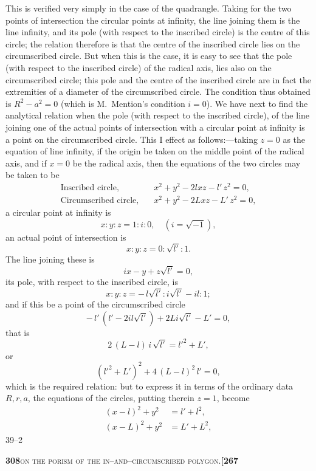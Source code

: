 \documentclass[11pt]{article}
\begin{document}
\noindent This is verified very simply in the case of the quadrangle. Taking for the two points of intersection the circular points at infinity, the line joining them is the line infinity, and its pole (with respect to the inscribed circle) is the centre of this circle; the relation therefore is that the centre of the inscribed circle lies on the circumscribed circle. But when this is the case, it is easy to see that the pole (with respect to the inscribed circle) of the radical axis, lies also on the circumscribed circle; this pole and the centre of the inscribed circle are in fact the extremities of a diameter of the circumscribed circle. The condition thus obtained is $R^2 - a^2 = 0$ (which is M.~Mention's condition $i = 0$). We have next to find the analytical relation when the pole (with respect to the inscribed circle), of the line joining one of the actual points of intersection with a circular point at infinity is a point on the circumscribed circle. This I effect as follows:---taking $z = 0$ as the equation of line infinity, if the origin be taken on the middle point of the radical axis, and if $x = 0$ be the radical axis, then the equations of the two circles may be taken to be
\[
\begin{aligned}
\text{Inscribed circle,} &\quad x^2 + y^2 - 2 l x z - l'\,z^2 = 0,\\
\text{Circumscribed circle,} &\quad x^2 + y^2 - 2 L x z - L'\,z^2 = 0,
\end{aligned}
\]
a circular point at infinity is
\[
   x : y : z = 1 : i : 0,\quad (i = \sqrt{-1}),
\]
an actual point of intersection is
\[
   x : y : z = 0 : \sqrt{l'} : 1.
\]
The line joining these is
\[
   i x - y + z\sqrt{l'} = 0,
\]
its pole, with respect to the inscribed circle, is
\[
   x : y : z = -\,l\sqrt{l'} : i\sqrt{l'} - i l : 1;
\]
and if this be a point of the circumscribed circle
\[
   -\,l'\,(l' - 2 i l\sqrt{l'}) + 2 L i\sqrt{l'} - L' = 0,
\]
that is
\[
   2\,(L - l)\,i\,\sqrt{l'} = l'^2 + L',
\]
or
\[
   (l'^2 + L')^2 + 4\,(L - l)^2\,l' = 0,
\]
which is the required relation: but to express it in terms of the ordinary data $R, r, a$, the equations of the circles, putting therein $z = 1$, become
\[
\begin{aligned}
   (x - l)^2 + y^2 &= l' + l^2,\\
   (x - L)^2 + y^2 &= L' + L^2,
\end{aligned}
\]
\hfill 39--2

\newpage
\setcounter{page}{308}

\noindent\textbf{308}\hfill\textsc{on the porism of the in--and--circumscribed polygon.}\hfill\textbf{[267}
\end{document}
